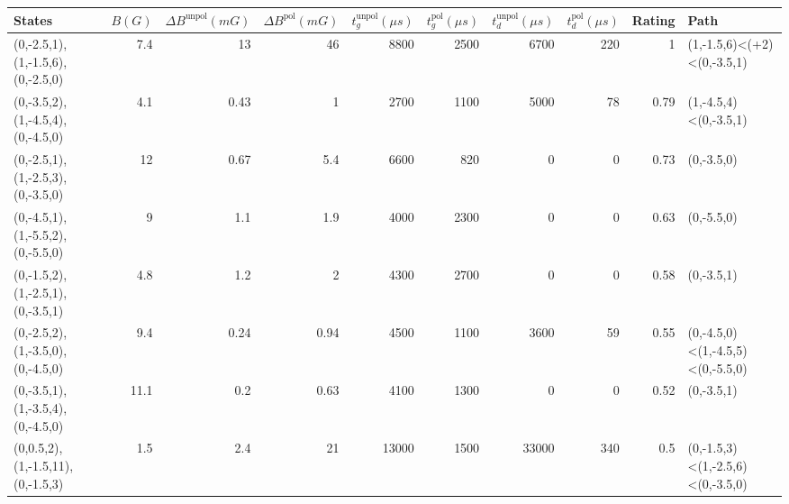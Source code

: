 \begin{tabular}{lrrrrrrrrl}
\hline
 {States}                         &   {$B(G)$} &   {$\Delta B^{\text{unpol}}(mG)$} &   {$\Delta B^{\text{pol}}(mG)$} &   {$t^{\text{unpol}}_{g}(\mu s)$} &   {$t^{\text{pol}}_{g}(\mu s)$} &   {$t^{\text{unpol}}_{d}(\mu s)$} &   {$t^{\text{pol}}_{d}(\mu s)$} &   {Rating} & {Path}                           \\
\hline
 (0,-2.5,1),(1,-1.5,6),(0,-2.5,0) &        7.4 &                             13    &                           46    &                              8800 &                            2500 &                              6700 &                             220 &       1    & (1,-1.5,6)<(+2)<(0,-3.5,1)       \\
 (0,-3.5,2),(1,-4.5,4),(0,-4.5,0) &        4.1 &                              0.43 &                            1    &                              2700 &                            1100 &                              5000 &                              78 &       0.79 & (1,-4.5,4)<(0,-3.5,1)            \\
 (0,-2.5,1),(1,-2.5,3),(0,-3.5,0) &       12   &                              0.67 &                            5.4  &                              6600 &                             820 &                                 0 &                               0 &       0.73 & (0,-3.5,0)                       \\
 (0,-4.5,1),(1,-5.5,2),(0,-5.5,0) &        9   &                              1.1  &                            1.9  &                              4000 &                            2300 &                                 0 &                               0 &       0.63 & (0,-5.5,0)                       \\
 (0,-1.5,2),(1,-2.5,1),(0,-3.5,1) &        4.8 &                              1.2  &                            2    &                              4300 &                            2700 &                                 0 &                               0 &       0.58 & (0,-3.5,1)                       \\
 (0,-2.5,2),(1,-3.5,0),(0,-4.5,0) &        9.4 &                              0.24 &                            0.94 &                              4500 &                            1100 &                              3600 &                              59 &       0.55 & (0,-4.5,0)<(1,-4.5,5)<(0,-5.5,0) \\
 (0,-3.5,1),(1,-3.5,4),(0,-4.5,0) &       11.1 &                              0.2  &                            0.63 &                              4100 &                            1300 &                                 0 &                               0 &       0.52 & (0,-3.5,1)                       \\
 (0,0.5,2),(1,-1.5,11),(0,-1.5,3) &        1.5 &                              2.4  &                           21    &                             13000 &                            1500 &                             33000 &                             340 &       0.5  & (0,-1.5,3)<(1,-2.5,6)<(0,-3.5,0) \\
\hline
\end{tabular}